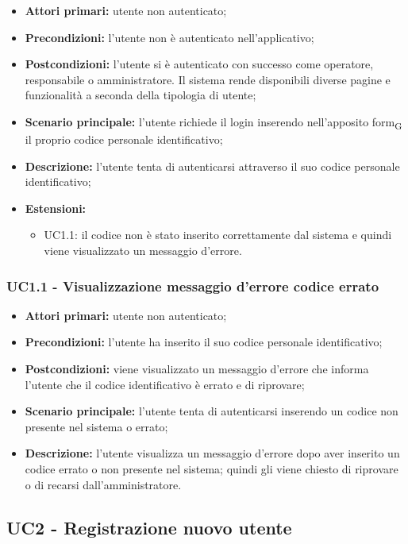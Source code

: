 \begin{itemize}
	\item 	\textbf{Attori primari:} utente non autenticato;
	\item 	\textbf{Precondizioni:} l'utente non è autenticato nell'applicativo;
	\item 	\textbf{Postcondizioni:}	l'utente si è autenticato con successo come operatore, responsabile o amministratore. Il sistema rende disponibili diverse pagine e funzionalità a seconda della tipologia di utente;
	\item 	\textbf{Scenario principale:} l'utente richiede il login inserendo nell'apposito \gls{form}\textsubscript{G} il proprio codice personale identificativo;
	\item 	\textbf{Descrizione:} l'utente tenta di autenticarsi attraverso il suo codice personale identificativo;
	\item 	\textbf{Estensioni:} 
		\begin{itemize}
			\item UC1.1: il codice non è stato inserito correttamente dal sistema e quindi viene visualizzato un messaggio d'errore.
		\end{itemize}
\end{itemize}
\subsubsection{UC1.1 - Visualizzazione messaggio d'errore codice errato}

\begin{itemize}
	\item 	\textbf{Attori primari:} utente non autenticato;
	\item 	\textbf{Precondizioni:} l'utente ha inserito il suo codice personale identificativo;
	\item 	\textbf{Postcondizioni:} viene visualizzato un messaggio d'errore che informa l'utente che il codice identificativo è errato e di riprovare;
	\item 	\textbf{Scenario principale:} l'utente tenta di autenticarsi inserendo un codice non presente nel sistema o errato;
	\item 	\textbf{Descrizione:} l'utente visualizza un messaggio d'errore dopo aver inserito un codice errato o non presente nel sistema; quindi gli viene chiesto di riprovare o di recarsi dall'amministratore.
	
\end{itemize}

\subsection{UC2 - Registrazione nuovo utente}

